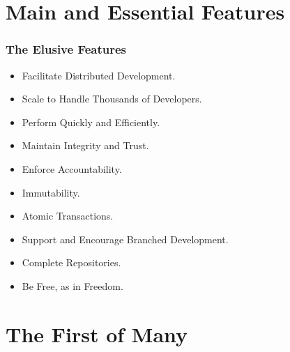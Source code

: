 \documentclass[22pt]{beamer}
\begin{document}
\section{Main and Essential Features}
\begin{frame}
    \frametitle{The Elusive Features}
    \begin{itemize}
        \item Facilitate Distributed Development.
              \pause
        \item Scale to Handle Thousands of Developers.
              \pause
        \item Perform Quickly and Efficiently.
              \pause
        \item Maintain Integrity and Trust.
              \pause
        \item Enforce Accountability.
              \pause
        \item Immutability.
              \pause
        \item Atomic Transactions.
              \pause
        \item Support and Encourage Branched Development.
              \pause
        \item Complete Repositories.
              \pause
        \item Be Free, as in Freedom.
    \end{itemize}



\end{frame}

\section{The First of Many}
\end{document}

